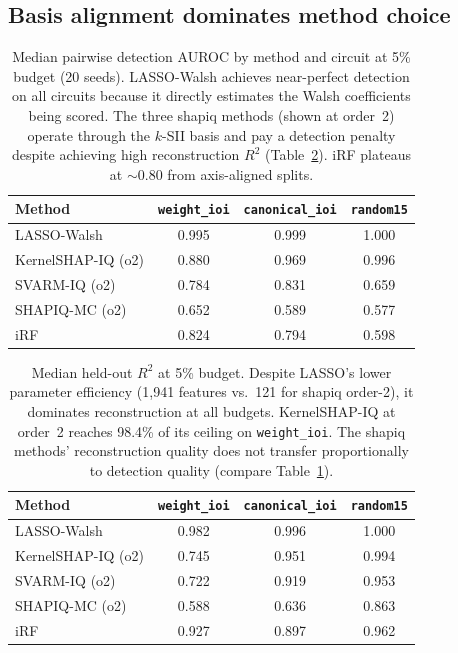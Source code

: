 \documentclass[10pt]{article}
\begin{document}
\subsection{Basis alignment dominates method choice}
\label{sec:basis-alignment}

\begin{table}[t]
\centering
\caption{Median pairwise detection AUROC by method and circuit at 5\%
budget (20 seeds). LASSO-Walsh achieves near-perfect detection on all
circuits because it directly estimates the Walsh coefficients being
scored. The three shapiq methods (shown at order~2) operate through
the $k$-SII basis and pay a detection penalty despite achieving high
reconstruction $R^2$ (Table~\ref{tab:r2}). iRF plateaus at
$\sim$0.80 from axis-aligned splits.}
\label{tab:auroc}
\begin{tabular}{lccc}
\toprule
Method & \texttt{weight\_ioi} & \texttt{canonical\_ioi} & \texttt{random15} \\
\midrule
LASSO-Walsh        & 0.995 & 0.999 & 1.000 \\
KernelSHAP-IQ (o2) & 0.880 & 0.969 & 0.996 \\
SVARM-IQ (o2)      & 0.784 & 0.831 & 0.659 \\
SHAPIQ-MC (o2)     & 0.652 & 0.589 & 0.577 \\
iRF                & 0.824 & 0.794 & 0.598 \\
\bottomrule
\end{tabular}
\end{table}

\begin{table}[t]
\centering
\caption{Median held-out $R^2$ at 5\% budget. Despite LASSO's lower
parameter efficiency (1{,}941 features vs.\ 121 for shapiq order-2),
it dominates reconstruction at all budgets. KernelSHAP-IQ at order~2
reaches 98.4\% of its ceiling on \texttt{weight\_ioi}. The shapiq
methods' reconstruction quality does not transfer proportionally to
detection quality (compare Table~\ref{tab:auroc}).}
\label{tab:r2}
\begin{tabular}{lccc}
\toprule
Method & \texttt{weight\_ioi} & \texttt{canonical\_ioi} & \texttt{random15} \\
\midrule
LASSO-Walsh        & 0.982 & 0.996 & 1.000 \\
KernelSHAP-IQ (o2) & 0.745 & 0.951 & 0.994 \\
SVARM-IQ (o2)      & 0.722 & 0.919 & 0.953 \\
SHAPIQ-MC (o2)     & 0.588 & 0.636 & 0.863 \\
iRF                & 0.927 & 0.897 & 0.962 \\
\bottomrule
\end{tabular}
\end{table}
\end{document}
